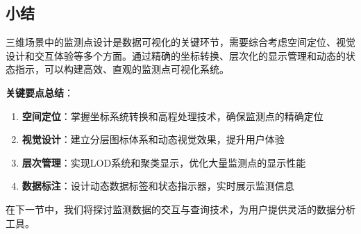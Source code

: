 \subsection{小结}\label{ux5c0fux7ed3}

三维场景中的监测点设计是数据可视化的关键环节，需要综合考虑空间定位、视觉设计和交互体验等多个方面。通过精确的坐标转换、层次化的显示管理和动态的状态指示，可以构建高效、直观的监测点可视化系统。

\textbf{关键要点总结}：

\begin{enumerate}
\def\labelenumi{\arabic{enumi}.}
\item
  \textbf{空间定位}：掌握坐标系统转换和高程处理技术，确保监测点的精确定位
\item
  \textbf{视觉设计}：建立分层图标体系和动态视觉效果，提升用户体验
\item
  \textbf{层次管理}：实现LOD系统和聚类显示，优化大量监测点的显示性能
\item
  \textbf{数据标注}：设计动态数据标签和状态指示器，实时展示监测信息
\end{enumerate}

在下一节中，我们将探讨监测数据的交互与查询技术，为用户提供灵活的数据分析工具。
